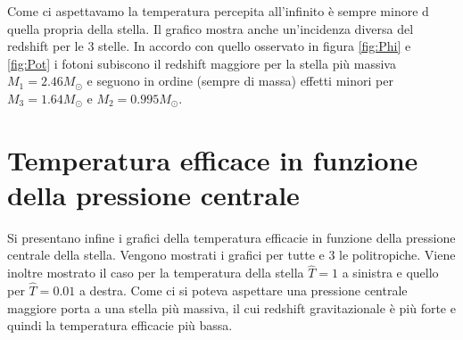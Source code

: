 \documentclass[a4paper, titlepage]{article}
\begin{document}
Come ci aspettavamo la temperatura percepita all'infinito è sempre minore d
quella propria della stella.
Il grafico mostra anche un'incidenza diversa del redshift per le 3 stelle.
In accordo con quello osservato in figura \ref{fig:Phi} e \ref{fig:Pot} i fotoni
subiscono il redshift maggiore per la stella più massiva $M_1 = 2.46 M_\odot$ e
seguono in ordine (sempre di massa) effetti minori per
$M_3 = 1.64 M_\odot$ e $M_2 = 0.995 M_\odot$.


\section{Temperatura efficace in funzione della pressione centrale}

Si presentano infine i grafici della temperatura efficacie in funzione della
pressione centrale della stella.
Vengono mostrati i grafici per tutte e 3 le politropiche.
Viene inoltre mostrato il caso per la temperatura della stella $\hat T = 1$ a
sinistra e quello per $\hat T = 0.01$ a destra.
Come ci si poteva aspettare una pressione centrale maggiore porta a una stella
più massiva, il cui redshift gravitazionale è più forte e quindi la temperatura
efficacie più bassa.
\end{document}
